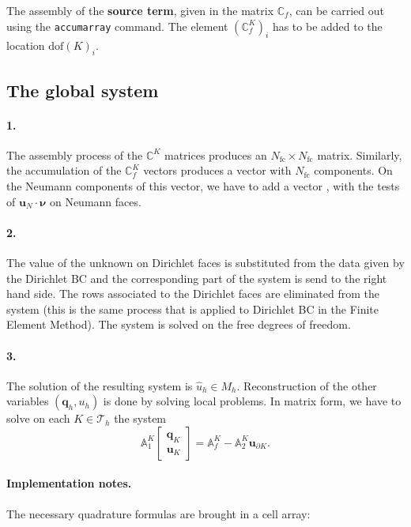 \documentclass[10pt,english]{article}
\newcommand{\Nfc}{{N_{\mathrm{fc}}}}
\begin{document}
The assembly of the {\bf source term}, given in the matrix $\mathbb C_f$, can be carried out  using the {\tt accumarray} command. The element $(\mathbb C_f^K)_i$ has to be added to the location $\mathrm{dof}(K)_i$.

\subsection{The global system}

\paragraph{1.} The assembly process of the $\mathbb C^K$ matrices produces an $\Nfc\times \Nfc$ matrix. Similarly, the accumulation of the $\mathbb C^K_f$ vectors produces a  vector with $\Nfc$ components. On the Neumann components of this vector, we have to add a vector , with the tests of $\boldsymbol u_N\cdot\boldsymbol\nu$ on Neumann faces.

\paragraph{2.} The value of the unknown on Dirichlet faces is substituted from the data given by the Dirichlet BC and the corresponding part of the system is send to the right hand side.
The rows associated to the Dirichlet faces are eliminated from the system (this is the same process that is applied to Dirichlet BC in the Finite Element Method). The system is solved on the free degrees of freedom.

\paragraph{3.} The solution of the resulting system is $\widehat u_h\in M_h$. Reconstruction of the other variables $(\boldsymbol  q_h,u_h)$ is done by solving local problems. In matrix form, we have to solve on each $K\in \mathcal T_h$ the system
\[
\mathbb A_1^K \left[\begin{array}{c}\mathbf q_K\\ \mathbf u_K\end{array}\right]=\mathbb A^K_f-\mathbb A^K_2 \mathbf u_{\partial K}.
\]

\paragraph{Implementation notes.} The necessary quadrature formulas are brought in a cell array:
\end{document}
